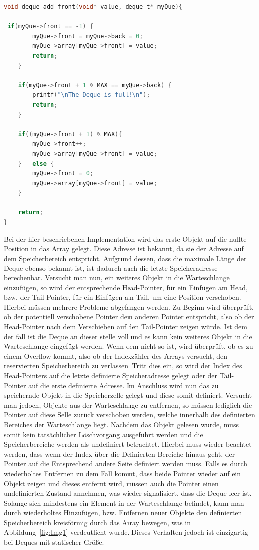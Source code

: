 \documentclass{TUBAFarbeiten}
\begin{document}
\begin{lstlisting}[language=C, frame=single, style=customc]
void deque_add_front(void* value, deque_t* myQue){
   
 if(myQue->front == -1) {
        myQue->front = myQue->back = 0;
        myQue->array[myQue->front] = value;
        return;
    }

    if(myQue->front + 1 % MAX == myQue->back) {
        printf("\nThe Deque is full!\n");
        return;
    }

    if((myQue->front + 1) % MAX){
        myQue->front++;
        myQue->array[myQue->front] = value;
    }   else {
        myQue->front = 0;
        myQue->array[myQue->front] = value;
    }

    return;
}
\end{lstlisting}
Bei der hier beschriebenen Implementation wird das erste Objekt auf die nullte Position in das Array gelegt. Diese Adresse ist bekannt, da sie der Adresse auf dem Speicherbereich entspricht. Aufgrund dessen, dass die maximale Länge der Deque ebenso bekannt ist, ist dadurch auch die letzte Speicheradresse berechenbar. Versucht man nun, ein weiteres Objekt in die Warteschlange einzufügen, so wird der entsprechende Head-Pointer, für ein Einfügen am Head, bzw. der Tail-Pointer, für ein Einfügen am Tail, um eine Position verschoben. Hierbei müssen mehrere Probleme abgefangen werden. Zu Beginn wird überprüft, ob der potentiell verschobene Pointer dem anderen Pointer entspricht, also ob der Head-Pointer nach dem Verschieben auf den Tail-Pointer zeigen würde. Ist dem der fall ist die Deque an dieser stelle voll und es kann kein weiteres Objekt in die Warteschlange eingefügt werden. Wenn dem nicht so ist, wird überprüft, ob es zu einem Overflow kommt, also ob der Indexzähler des Arrays versucht, den reservierten Speicherbereich zu verlassen. Tritt dies ein, so wird der Index des Head-Pointers auf die letzte definierte Speicheradresse gelegt oder der Tail-Pointer auf die erste definierte Adresse. Im Anschluss wird nun das zu speichernde Objekt in die Speicherzelle gelegt und diese somit definiert. Versucht man jedoch, Objekte aus der Warteschlange zu entfernen, so müssen lediglich die Pointer auf diese Selle zurück verschoben werden, welche innerhalb des definierten Bereiches der Warteschlange liegt. Nachdem das Objekt gelesen wurde, muss somit kein tatsächlicher Löschvorgang ausgeführt werden und die Speicherbereiche werden als undefiniert betrachtet. Hierbei muss wieder beachtet werden, dass wenn der Index über die Definierten Bereiche hinaus geht, der Pointer auf die Entsprechend andere Seite definiert werden muss. Falls es durch wiederholtes Entfernen zu dem Fall kommt, dass beide Pointer wieder auf ein Objekt zeigen und dieses entfernt wird, müssen auch die Pointer einen undefinierten Zustand annehmen, was wieder signalisiert, dass die Deque leer ist.
Solange sich mindestens ein Element in der Warteschlange befindet, kann man durch wiederholtes Hinzufügen, bzw. Entfernen neuer Objekte den definierten Speicherbereich kreisförmig durch das Array bewegen, was in Abbildung~\ref{fig:Img1} verdeutlicht wurde. Dieses Verhalten jedoch ist einzigartig bei Deques mit statischer Größe.
\end{document}
